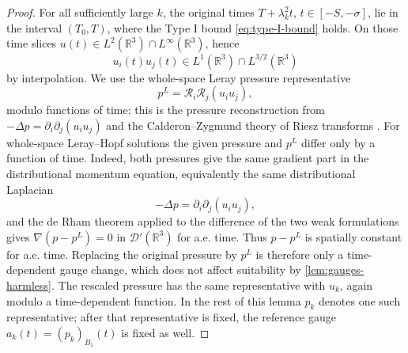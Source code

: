 \documentclass[11pt]{amsart}
\theoremstyle{plain}
\theoremstyle{definition}
\theoremstyle{remark}
\numberwithin{equation}{section}
\newcommand{\R}{\mathbb R}
\begin{document}
\begin{proof}
For all sufficiently large \(k\), the original times
\(T+\lambda_k^2t\), \(t\in[-S,-\sigma]\), lie in the interval
\((T_0,T)\), where the Type I bound \eqref{eq:type-I-bound} holds.  On those
time slices \(u(t)\in L^2(\R^3)\cap L^\infty(\R^3)\), hence
\[
   u_i(t)u_j(t)\in L^1(\R^3)\cap L^{3/2}(\R^3)
\]
by interpolation.  We use the whole-space Leray pressure representative
\[
   p^L=\mathcal R_i\mathcal R_j(u_i u_j),
\]
modulo functions of time; this is the pressure reconstruction from
\(-\Delta p=\partial_i\partial_j(u_i u_j)\) and the Calderon--Zygmund theory
of Riesz transforms \cite{Stein1970,Sohr2001}.  For whole-space Leray--Hopf
solutions the given pressure and \(p^L\) differ only by a function of time.
Indeed, both pressures give the same gradient part in the distributional
momentum equation, equivalently the same distributional Laplacian
\[
   -\Delta p=\partial_i\partial_j(u_i u_j),
\]
and the de Rham theorem applied to the difference of the two weak formulations
gives \(\nabla(p-p^L)=0\) in \(\mathcal D'(\R^3)\) for a.e. time.  Thus
\(p-p^L\) is spatially constant for a.e. time.  Replacing the original
pressure by \(p^L\) is therefore only a time-dependent gauge change, which
does not affect suitability by \cref{lem:gauges-harmless}.  The rescaled
pressure has the same representative with \(u_k\), again modulo a
time-dependent function.  In the rest of this lemma \(p_k\) denotes one such
representative; after that representative is fixed, the reference gauge
\(a_k(t)=(p_k)_{B_1}(t)\) is fixed as well.


\end{proof}
\end{document}
